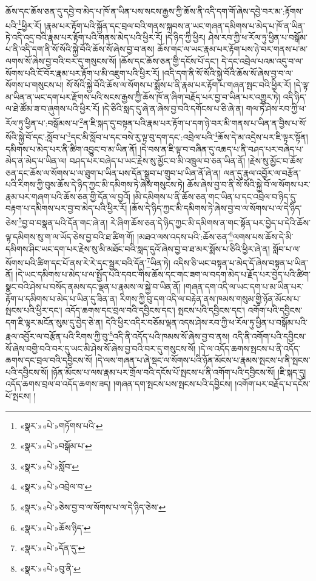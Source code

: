 ཆོས་དང་ཆོས་ཅན་དུ་དབྱེ་བ་མེད་པ་ཁོ་ན་ཡིན་པས་སངས་རྒྱས་ཀྱི་ཆོས་ནི་འདི་དག་གོ་ཞེས་དབྱེ་བར་མ་:རྟོགས་པའི་\footnote{«སྣར་»«པེ་»གཏོགས་པའི་}ཕྱིར་རོ། །རྣམ་པར་རྟོག་པའི་སྐྱོན་དང་བྲལ་བའི་གནས་སྐབས་ན་ཡང་གཞན་དམིགས་པ་མེད་པ་ཁོ་ན་ཡིན་ཏེ་འདི་འདྲ་བའི་རྣམ་པར་རྟོག་པའི་གནས་མེད་པའི་ཕྱིར་རོ། །དེ་ཉིད་ཀྱི་ཕྱིར། ཤེས་རབ་ཀྱི་ཕ་རོལ་ཏུ་ཕྱིན་པ་བསྒོམ་པ་ནི་འདི་དག་ནི་སོ་སོའི་སྐྱེ་བོའི་ཆོས་སོ་ཞེས་བྱ་བ་ནས། ཆོས་གང་ལ་ཡང་རྣམ་པར་རྟོག་པས་ཉེ་བར་གནས་པ་མ་ལགས་སོ་ཞེས་བྱ་བའི་བར་དུ་གསུངས་སོ། །ཆོས་དང་ཆོས་ཅན་གྱི་དངོས་པོ་དང་། དེ་དང་འབྲེལ་པའམ་འདུ་བ་ལ་སོགས་པའི་ངོ་བོར་རྣམ་པར་རྟོག་པ་མི་འཇུག་པའི་ཕྱིར་རོ། །འདི་དག་ནི་སོ་སོའི་སྐྱེ་བོའི་ཆོས་སོ་ཞེས་བྱ་བ་ལ་སོགས་པ་གསུངས་པ། སོ་སོའི་སྐྱེ་བོའི་ཆོས་ལ་སོགས་པ་སྨོས་པ་ནི་རྣམ་པར་རྟོག་པ་གཞན་སྤང་བའི་ཕྱིར་རོ། །དེ་ལྟ་མ་ཡིན་ན་ཡང་དག་པར་རྫོགས་པའི་སངས་རྒྱས་ཀྱི་ཆོས་ཁོ་ན་ཞིག་བརྗོད་པར་བྱ་བ་ཡིན་པར་འགྱུར་ཏེ། འདི་ཉིད་ལ་ཐེ་ཚོམ་ཟ་བ་ཞུགས་པའི་ཕྱིར་རོ། །དེ་ཅིའི་སླད་དུ་ཞེ་ན་ཞེས་བྱ་བའི་དགོངས་པ་ཅི་ཞེ་ན། གལ་ཏེ་ཤེས་རབ་ཀྱི་ཕ་རོལ་ཏུ་ཕྱིན་པ་:བསྒོམས་པ་\footnote{«སྣར་»«པེ་»བསྒོམ་པ་}ན་ཇི་སྐད་དུ་བསྟན་པའི་རྣམ་པར་རྟོག་པ་དག་ཉེ་བར་མི་གནས་པ་ཡིན་ན་བྱིས་པ་སོ་སོའི་སྐྱེ་བོ་དང་:སློབ་པ་\footnote{«སྣར་»«པེ་»སློབ་}དང་མི་སློབ་པ་དང་བསེ་རུ་ལྟ་བུ་དག་དང་:འབྲེལ་པའི་\footnote{«སྣར་»«པེ་»འབྲེལ་བ་}ཆོས་དེ་མ་འདྲེས་པར་ཇི་ལྟར་སྟོན། དམིགས་པ་མེད་པར་ནི་ཚིག་འབྱུང་བ་མ་ཡིན་ནོ། །དེ་བས་ན་ཇི་ལྟ་བ་བཞིན་དུ་འཆད་པ་ནི་བཤད་པར་བཞེད་པ་མེད་ན་མེད་པ་ཡིན་ལ། བཤད་པར་བཞེད་པ་ཡང་རྗེས་སུ་མྱོང་བ་མི་འཁྲུལ་བ་ཅན་ཡིན་ནོ། །རྗེས་སུ་མྱོང་བ་ཆོས་ཅན་དང་ཆོས་ལ་སོགས་པ་ལ་ཐུག་པ་ཡིན་པས་དོན་སྒྲུབ་པ་གྲུབ་པ་ཡིན་ནོ་ཞེ་ན། ལན་དུ་རྣལ་འབྱོར་ལ་བརྩོན་པའི་རིགས་ཀྱི་བུས་ཆོས་དེ་ཉིད་ཀྱང་མི་དམིགས་ཏེ་ཞེས་གསུངས་ཏེ། ཆོས་ཞེས་བྱ་བ་ནི་སོ་སོའི་སྐྱེ་བོ་ལ་སོགས་པར་རྣམ་པར་གཞག་པའི་ཆོས་ཅན་གྱི་དོན་ལ་བྱའོ། །མི་དམིགས་པ་ནི་ཆོས་ཅན་གང་ཡིན་པ་དང་འབྲེལ་བ་ཉིད་དུ་བརྟག་པ་དམིགས་པར་བྱ་བ་མེད་པའི་ཕྱིར་རོ། །ཆོས་དེ་ཉིད་ཀྱང་མི་དམིགས་ཏེ་ཞེས་བྱ་བ་ལ་སོགས་པ་ལ་དེ་ཉིད་ཅེས་\footnote{«སྣར་»«པེ་»ཅེས་བྱ་བ་ལ་སོགས་པ་ལ་དེ་ཉིད་ཅེས་}བྱ་བ་བསྣན་པའི་དོན་གང་ཞེ་ན། རེ་ཞིག་ཆོས་ཅན་དེ་ཉིད་ཀྱང་མི་དམིགས་ན་གང་སྟོན་པར་བྱེད་པ་དེའི་ཆོས་ལྟ་དམིགས་སུ་ག་ལ་ཡོད་ཅེས་བྱ་བའི་ཐ་ཚིག་གོ། །མཐའ་ལས་འདས་པའི་:ཆོས་ཅན་\footnote{«སྣར་»«པེ་»ཆོས་ཉིད་}ལགས་པས་ཆོས་དེ་མི་དམིགས་ཤིང་ཡང་དག་པར་རྗེས་སུ་མི་མཐོང་བའི་སླད་དུའོ་ཞེས་བྱ་བ་ཐ་མར་སྨོས་པ་ཅིའི་ཕྱིར་ཞེ་ན། སློབ་པ་ལ་སོགས་པའི་ཚིག་དང་པོ་ནས་རེ་རེ་དང་སྦྱར་བའི་དོན་\footnote{«སྣར་»«པེ་»དོན་དུ་}ཡིན་ཏེ། འདིས་ཅི་ཡང་བསྟན་པ་མེད་དོ་ཞེས་བསྟན་པ་ཡིན་ནོ། །དེ་ཡང་དམིགས་པ་མེད་པ་ལ་སྤྱོད་པའི་དབང་གིས་ཆོས་དང་གང་ཟག་ལ་བདག་མེད་པ་རྗོད་པར་བྱེད་པའི་ཚིག་སྣང་བའི་ཤེས་པ་བསོད་ནམས་དང་ལྡན་པ་རྣམས་ལ་སྐྱེ་བ་ཡིན་ནོ། །གཞན་དག་འདི་ལ་ཡང་དག་པ་མ་ཡིན་པར་རྟོག་པ་དམིགས་པ་མེད་པ་ཡིན་དུ་ཟིན་ན། རིགས་ཀྱི་བུ་དག་འདི་ལ་བརྟེན་ནས་ཁམས་གསུམ་གྱི་ཉོན་མོངས་པ་སྤངས་པའི་ཕྱིར་དང་། འདོད་ཆགས་དང་བྲལ་བའི་དབྱིངས་དང་། སྤངས་པའི་དབྱིངས་དང་། འགོག་པའི་དབྱིངས་དག་ཇི་ལྟར་མངོན་སུམ་དུ་བྱེད་ཅེ་ན། དེའི་ཕྱིར་འདིར་བཅོམ་ལྡན་འདས་ཤེས་རབ་ཀྱི་ཕ་རོལ་ཏུ་ཕྱིན་པ་བསྒོམ་པའི་རྣལ་འབྱོར་ལ་བརྩོན་པའི་རིགས་ཀྱི་བུ་\footnote{«སྣར་»«པེ་»བུ་ནི་}འདི་ནི་འདོད་པའི་ཁམས་སོ་ཞེས་བྱ་བ་ནས། འདི་ནི་འགོག་པའི་དབྱིངས་སོ་ཞེས་བགྱི་བའི་བར་དུ་ཡང་མི་ཤེས་སོ་ཞེས་བྱ་བའི་བར་དུ་གསུངས་སོ། །དེ་ལ་འདོད་ཆགས་སྤངས་པ་ནི་འདོད་ཆགས་དང་བྲལ་བའི་དབྱིངས་སོ། །དེ་ལས་གཞན་པ་ཞེ་སྡང་ལ་སོགས་པའི་ཉོན་མོངས་པ་རྣམས་སྤངས་པ་ནི་སྤངས་པའི་དབྱིངས་སོ། །ཉོན་མོངས་པ་ལས་རྣམ་པར་གྲོལ་བའི་དངོས་པོ་སྤངས་པ་ནི་འགོག་པའི་དབྱིངས་སོ། །ཇི་སྐད་དུ། འདོད་ཆགས་བྲལ་བ་འདོད་ཆགས་ཟད། །གཞན་དག་སྤངས་པས་སྤངས་པའི་དབྱིངས། །འགོག་པར་བརྗོད་པ་དངོས་པོ་སྤངས། །
